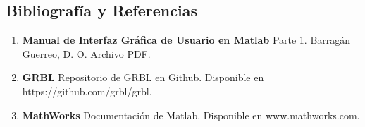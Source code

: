 \documentclass{article}
\begin{document}
\begin{multicols}{2}
{\centering \section{Bibliografía y Referencias}}
\begin{enumerate}
\item \textbf{Manual de Interfaz Gráfica de Usuario en Matlab} Parte 1. Barragán Guerreo, D. O. Archivo PDF.
\item \textbf{GRBL} Repositorio de GRBL en Github. Disponible en https://github.com/grbl/grbl.
\item \textbf{MathWorks} Documentación de Matlab. Disponible en www.mathworks.com.
\end{enumerate}
\end{multicols}
\end{document}
